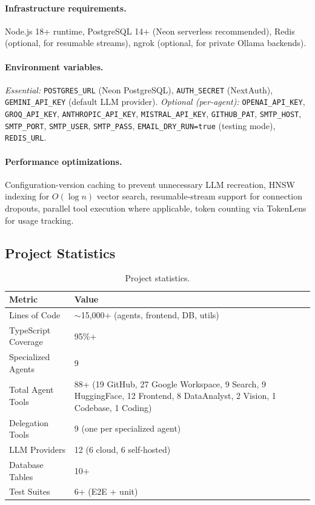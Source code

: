 \documentclass[11pt,a4paper]{report}
\newcommand{\code}[1]{\texttt{\small #1}}
\begin{document}
\paragraph{Infrastructure requirements.}
Node.js 18+ runtime, PostgreSQL 14+ (Neon serverless recommended), Redis
(optional, for resumable streams), ngrok (optional, for private Ollama
backends).

\paragraph{Environment variables.}
\textit{Essential:} \code{POSTGRES\_URL} (Neon PostgreSQL), \code{AUTH\_SECRET}
(NextAuth), \code{GEMINI\_API\_KEY} (default LLM provider).
\textit{Optional (per-agent):} \code{OPENAI\_API\_KEY}, \code{GROQ\_API\_KEY},
\code{ANTHROPIC\_API\_KEY}, \code{MISTRAL\_API\_KEY}, \code{GITHUB\_PAT},
\code{SMTP\_HOST}, \code{SMTP\_PORT}, \code{SMTP\_USER}, \code{SMTP\_PASS},
\code{EMAIL\_DRY\_RUN=true} (testing mode), \code{REDIS\_URL}.

\paragraph{Performance optimizations.}
Configuration-version caching to prevent unnecessary LLM recreation, HNSW
indexing for $O(\log n)$ vector search, resumable-stream support for
connection dropouts, parallel tool execution where applicable, token counting
via TokenLens for usage tracking.

\subsection{Project Statistics}

\begin{table}[H]
\centering
\begin{tabular}{@{}L{4.3cm} L{8.8cm}@{}}
\toprule
\textbf{Metric} & \textbf{Value}\\
\midrule
Lines of Code       & $\sim$15,000+ (agents, frontend, DB, utils)\\
TypeScript Coverage & 95\%+\\
Specialized Agents  & 9\\
Total Agent Tools   & 88+ (19 GitHub, 27 Google Workspace, 9 Search, 9 HuggingFace, 12 Frontend, 8 DataAnalyst, 2 Vision, 1 Codebase, 1 Coding)\\
Delegation Tools    & 9 (one per specialized agent)\\
LLM Providers       & 12 (6 cloud, 6 self-hosted)\\
Database Tables     & 10+\\
Test Suites         & 6+ (E2E + unit)\\
\bottomrule
\end{tabular}
\caption{Project statistics.}
\end{table}
\end{document}
